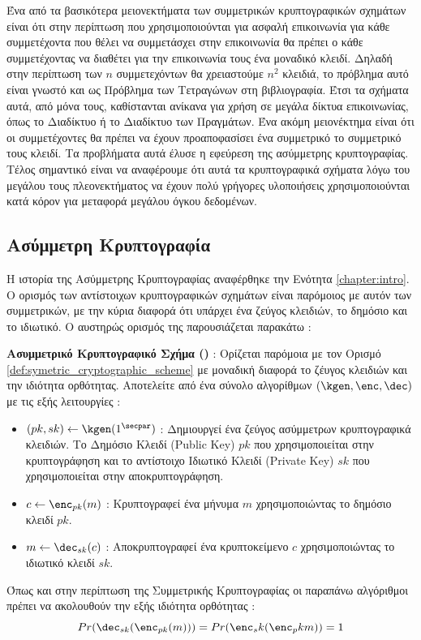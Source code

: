 Ένα από τα βασικότερα μειονεκτήματα των συμμετρικών κρυπτογραφικών σχημάτων είναι ότι στην περίπτωση που χρησιμοποιούνται για ασφαλή επικοινωνία για κάθε συμμετέχοντα που θέλει να συμμετάσχει στην επικοινωνία θα πρέπει ο κάθε συμμετέχοντας να διαθέτει για την επικοινωνία τους ένα μοναδικό κλειδί. Δηλαδή στην περίπτωση των $n$ συμμετεχόντων θα χρειαστούμε $n^2$ κλειδιά, το πρόβλημα αυτό είναι γνωστό και ως Πρόβλημα των Τετραγώνων στη βιβλιογραφία. Έτσι τα σχήματα αυτά, από μόνα τους, καθίστανται ανίκανα για χρήση σε μεγάλα δίκτυα επικοινωνίας, όπως το Διαδίκτυο ή το Διαδίκτυο των Πραγμάτων. Ένα ακόμη μειονέκτημα είναι ότι οι συμμετέχοντες θα πρέπει να έχουν προαποφασίσει ένα συμμετρικό το συμμετρικό τους κλειδί. Τα προβλήματα αυτά έλυσε η εφεύρεση της ασύμμετρης κρυπτογραφίας. Τέλος σημαντικό είναι να αναφέρουμε ότι αυτά τα κρυπτογραφικά σχήματα λόγω του μεγάλου τους πλεονεκτήματος να έχουν πολύ γρήγορες υλοποιήσεις χρησιμοποιούνται κατά κόρον για μεταφορά μεγάλου όγκου δεδομένων.

\subsection{Ασύμμετρη Κρυπτογραφία}

Η ιστορία της Ασύμμετρης Κρυπτογραφίας αναφέρθηκε την Ενότητα \ref{chapter:intro}. Ο ορισμός των αντίστοιχων κρυπτογραφικών σχημάτων είναι παρόμοιος με αυτόν των συμμετρικών, με την κύρια διαφορά ότι υπάρχει ένα ζεύγος κλειδιών, το δημόσιο και το ιδιωτικό. Ο αυστηρώς ορισμός της παρουσιάζεται παρακάτω :

\begin{definition}
\label{def:assymetric_cryptographic_scheme}
\textbf{Ασυμμετρικό Κρυπτογραφικό Σχήμα ()} : Ορίζεται παρόμοια με τον Ορισμό \ref{def:symetric_cryptographic_scheme} με μοναδική διαφορά το ζέυγος κλειδιών και την ιδιότητα ορθότητας. Αποτελείτε από ένα σύνολο αλγορίθμων $(\kgen, \enc, \dec)$ με τις εξής λειτουργίες :
\begin{itemize}
    \item $(pk, sk) \leftarrow \kgen(1^\secpar)$ : Δημιουργεί ένα ζεύγος ασύμμετρων κρυπτογραφικά κλειδιών. Το Δημόσιο Κλειδί (Public Key) $pk$ που χρησιμοποιείται στην κρυπτογράφηση και το αντίστοιχο Ιδιωτικό Κλειδί (Private Key) $sk$ που χρησιμοποιείται στην αποκρυπτογράφηση.
    \item $c \leftarrow \enc_{pk}(m)$ : Κρυπτογραφεί ένα μήνυμα $m$ χρησιμοποιώντας το δημόσιο κλειδί $pk$.
    \item $m \leftarrow \dec_{sk}(c)$ : Αποκρυπτογραφεί ένα κρυπτοκείμενο $c$ χρησιμοποιώντας το ιδιωτικό κλειδί $sk$.
\end{itemize}
Όπως και στην περίπτωση της Συμμετρικής Κρυπτογραφίας οι παραπάνω αλγόριθμοι πρέπει να ακολουθούν την εξής ιδιότητα ορθότητας :
$$
    Pr(\dec_{sk}(\enc_{pk}(m))) = Pr(\enc_sk(\enc_pk{m})) = 1
$$
\end{definition}

